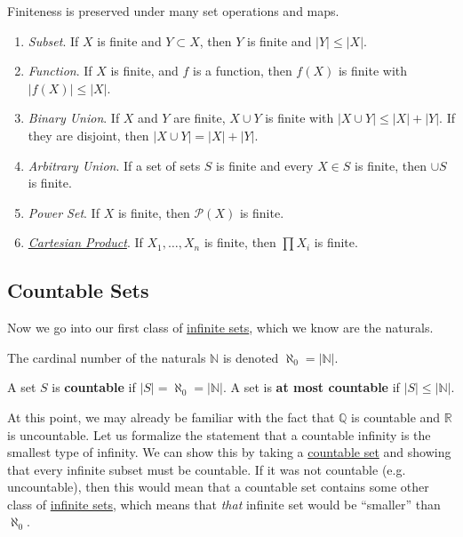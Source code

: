   \begin{theorem}
    \label{thm:preservation-of-finite-cardinality}
    Finiteness is preserved under many set operations and maps. 
    \begin{enumerate}
      \item \textit{Subset}. If $X$ is finite and $Y \subset X$, then $Y$ is finite and $|Y| \leq |X|$. 
      \item \textit{Function}. If $X$ is finite, and $f$ is a function, then $f(X)$ is finite with $|f(X)| \leq |X|$. 
      \item \textit{Binary Union}. If $X$ and $Y$ are finite, $X \cup Y$ is finite with $|X \cup Y| \leq |X| + |Y|$.  If they are disjoint, then $|X \cup Y| = |X| + |Y|$. 
      \item \textit{Arbitrary Union}. If a set of sets $S$ is finite and every $X \in S$ is finite, then $\cup S$ is finite. 
      \item \textit{Power Set}. If $X$ is finite, then $\mathcal{P}(X)$ is finite. 
      \item \textit{\hyperref[def:cartesian-product]{Cartesian Product}}. If $X_1, \ldots, X_n$ is finite, then $\prod X_i$ is finite. 
    \end{enumerate}
  \end{theorem}

\subsection{Countable Sets}

  Now we go into our first class of \hyperref[def:infinite-set]{infinite sets}, which we know are the naturals. 

  \begin{definition}
    \label{def:aleph-null}
    The cardinal number of the naturals $\mathbb{N}$ is denoted $\aleph_0 = |\mathbb{N}|$. 
  \end{definition}

  \begin{definition}
    \label{def:countable}
    A set $S$ is \textbf{countable} if $|S| = \aleph_0 = |\mathbb{N}|$. A set is \textbf{at most countable} if $|S| \leq |\mathbb{N}|$. 
  \end{definition} 

  At this point, we may already be familiar with the fact that $\mathbb{Q}$ is countable and $\mathbb{R}$ is uncountable. Let us formalize the statement that a countable infinity is the smallest type of infinity. We can show this by taking a \hyperref[def:countable]{countable set} and showing that every infinite subset must be countable. If it was not countable (e.g. uncountable), then this would mean that a countable set contains some other class of \hyperref[def:infinite-set]{infinite sets}, which means that \textit{that} infinite set would be ``smaller'' than $\aleph_0$. 

